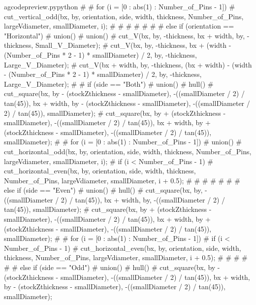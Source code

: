 \documentclass{ltxdoc}
\begin{document}
\begin{writecode}{a}{gcodepreview.py}{python}
{{{{{{#          }
#          for (i = [0 : abs(1) : Number_of_Pins - 1]) {
#            cut_vertical_odd(bx, by, orientation, side, width, thickness, Number_of_Pins, largeVdiameter, smallDiameter, i);
#          }
#
#        }
#      }
#
#    }
#  } else if (orientation == "Horizontal") {
#    union(){
#      union(){
#        cut_V(bx, by, -thickness, bx + width, by, -thickness, Small_V_Diameter);
#        cut_V(bx, by, -thickness, bx + (width - (Number_of_Pins * 2 - 1) * smallDiameter) / 2, by, -thickness, Large_V_Diameter);
#        cut_V(bx + width, by, -thickness, (bx + width) - (width - (Number_of_Pins * 2 - 1) * smallDiameter) / 2, by, -thickness, Large_V_Diameter);
#      }
#      if (side == "Both") {
#        union(){
#          hull(){
#            cut_square(bx, by - (stockZthickness - smallDiameter), -((smallDiameter / 2) / tan(45)), bx + width, by - (stockZthickness - smallDiameter), -((smallDiameter / 2) / tan(45)), smallDiameter);
#            cut_square(bx, by + (stockZthickness - smallDiameter), -((smallDiameter / 2) / tan(45)), bx + width, by + (stockZthickness - smallDiameter), -((smallDiameter / 2) / tan(45)), smallDiameter);
#          }
#          for (i = [0 : abs(1) : Number_of_Pins - 1]) {
#            union(){
#              cut_horizontal_odd(bx, by, orientation, side, width, thickness, Number_of_Pins, largeVdiameter, smallDiameter, i);
#              if (i < Number_of_Pins - 1) {
#                cut_horizontal_even(bx, by, orientation, side, width, thickness, Number_of_Pins, largeVdiameter, smallDiameter, i + 0.5);
#              }
#
#            }
#          }
#
#        }
#      } else if (side == "Even") {
#        union(){
#          hull(){
#            cut_square(bx, by, -((smallDiameter / 2) / tan(45)), bx + width, by, -((smallDiameter / 2) / tan(45)), smallDiameter);
#            cut_square(bx, by + (stockZthickness - smallDiameter), -((smallDiameter / 2) / tan(45)), bx + width, by + (stockZthickness - smallDiameter), -((smallDiameter / 2) / tan(45)), smallDiameter);
#          }
#          for (i = [0 : abs(1) : Number_of_Pins - 1]) {
#            if (i < Number_of_Pins - 1) {
#              cut_horizontal_even(bx, by, orientation, side, width, thickness, Number_of_Pins, largeVdiameter, smallDiameter, i + 0.5);
#            }
#
#          }
#
#        }
#      } else if (side == "Odd") {
#        union(){
#          hull(){
#            cut_square(bx, by - (stockZthickness - smallDiameter), -((smallDiameter / 2) / tan(45)), bx + width, by - (stockZthickness - smallDiameter), -((smallDiameter / 2) / tan(45)), smallDiameter);
}}}}}}
\end{writecode}
\end{document}
